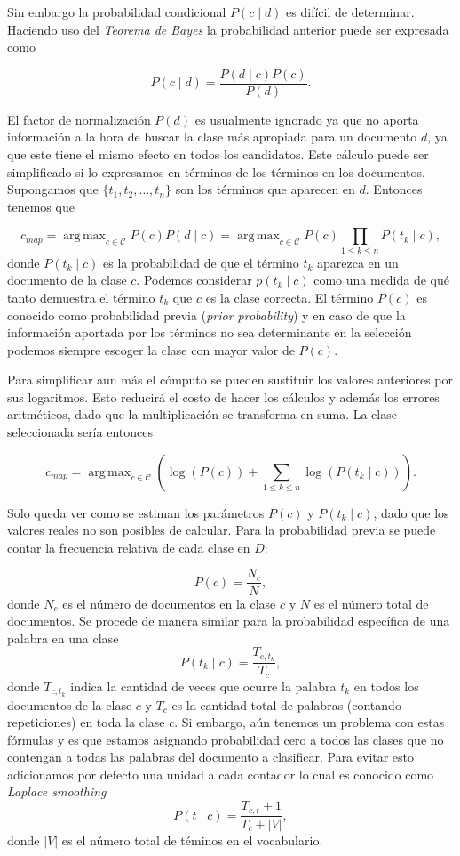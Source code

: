 \documentclass{llncs}
\DeclareMathOperator*{\argmax}{arg\,max}
\begin{document}
		Sin embargo la probabilidad condicional $P(c \mid d)$ es dif\'icil de determinar. Haciendo uso del \emph{Teorema de Bayes} la probabilidad anterior puede ser expresada como
		
		\[
		P(c \mid d) =\frac{ P(d\mid c) P(c)}{P(d)}.
		\]
		
		El factor de normalizaci\'on $P(d)$ es usualmente ignorado ya que no aporta informaci\'on a la hora de buscar la clase m\'as apropiada para un documento $d$, ya que este tiene el mismo efecto en todos los candidatos. Este c\'alculo puede ser simplificado si lo expresamos en t\'erminos de los t\'erminos en los documentos. Supongamos que $\{t_1, t_2, \dots , t_n \}$ son los t\'erminos que aparecen en $d$. Entonces tenemos que  
		
		\[
			c_{map} = \argmax_{c\in\mathcal{C}} P(c) P(d \mid c) = \argmax_{c\in\mathcal{C}} P(c) \prod_{1\leq k\leq n} P(t_k \mid c),
		\]
		donde $P(t_k \mid c)$ es la probabilidad de que el t\'ermino $t_k$ aparezca en un documento de la clase $c$. Podemos considerar $p(t_k \mid c)$ como una medida de qu\'e tanto demuestra el t\'ermino $t_k$ que $c$ es la clase correcta. El t\'ermino $P(c)$ es conocido como probabilidad previa (\emph{prior probability}) y en caso de que la informaci\'on aportada por los t\'erminos no sea determinante en la selecci\'on podemos siempre escoger la clase con mayor valor de $P(c)$.
		
		Para simplificar aun m\'as el c\'omputo se pueden sustituir los valores anteriores por sus logaritmos. Esto reducir\'a el costo de hacer los c\'alculos y adem\'as los errores aritm\'eticos, dado que la multiplicaci\'on se transforma en suma. La clase seleccionada ser\'ia entonces
		
		\[
				c_{map} = \argmax_{c\in\mathcal{C}} \left( \log(P(c))  + \sum_{1\leq k\leq n} \log(P(t_k\mid c)) \right).
		\]
		
		Solo queda ver como se estiman los par\'ametros $P(c)$ y $P (t_k\mid c)$, dado que los valores reales no son posibles de calcular.	Para la probabilidad previa se puede contar la frecuencia relativa de cada clase en $D$:
		
		\[P(c) = \frac{ N_c }{N} , \]
		donde $N_c$ es el n\'umero de documentos en la clase $c$ y $N$ es el n\'umero total de documentos. Se procede de manera similar para la probabilidad espec\'ifica de una palabra en una clase
		\[
			P(t_k\mid c) =\frac{ T_{c,t_k}}{T_{c}},
		\]
		donde $T_{c,t_k}$ indica la cantidad de veces que ocurre  la palabra $t_k$ en todos los documentos de la clase $c$ y $T_{c}$ es la cantidad total de palabras (contando repeticiones) en toda la clase $c$. Si embargo, a\'un tenemos un problema con estas f\'ormulas y es que estamos asignando probabilidad cero a todos las clases que no contengan a todas las palabras del documento a clasificar. Para evitar esto adicionamos por defecto una unidad a cada contador lo cual es conocido como \emph{Laplace smoothing}
		\[
			P(t\mid c) = \frac{T_{c,t} + 1}{T_c + |V|},	
		\]
		donde $|V|$ es el n\'umero total de t\'eminos en el vocabulario.
		
\end{document}
